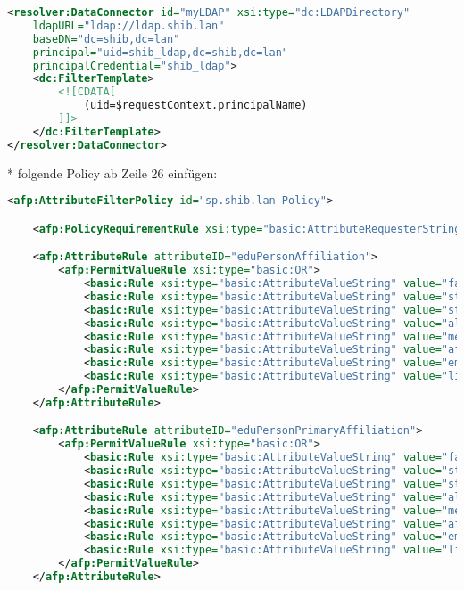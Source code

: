 \begin{lstlisting}[language=xml]
<resolver:DataConnector id="myLDAP" xsi:type="dc:LDAPDirectory"
	ldapURL="ldap://ldap.shib.lan"
	baseDN="dc=shib,dc=lan"
	principal="uid=shib_ldap,dc=shib,dc=lan"
	principalCredential="shib_ldap">
	<dc:FilterTemplate>
		<![CDATA[
			(uid=$requestContext.principalName)
		]]>
	</dc:FilterTemplate>
</resolver:DataConnector>
\end{lstlisting}
* folgende Policy ab Zeile 26 einfügen:
\begin{lstlisting}[language=xml]
<afp:AttributeFilterPolicy id="sp.shib.lan-Policy">

	<afp:PolicyRequirementRule xsi:type="basic:AttributeRequesterString" value="https://sp.shib.lan/shibboleth" />

	<afp:AttributeRule attributeID="eduPersonAffiliation">
		<afp:PermitValueRule xsi:type="basic:OR">
			<basic:Rule xsi:type="basic:AttributeValueString" value="faculty" ignoreCase="true" />
			<basic:Rule xsi:type="basic:AttributeValueString" value="student" ignoreCase="true" />
			<basic:Rule xsi:type="basic:AttributeValueString" value="staff" ignoreCase="true" />
			<basic:Rule xsi:type="basic:AttributeValueString" value="alum" ignoreCase="true" />
			<basic:Rule xsi:type="basic:AttributeValueString" value="member" ignoreCase="true" />
			<basic:Rule xsi:type="basic:AttributeValueString" value="affiliate" ignoreCase="true" />
			<basic:Rule xsi:type="basic:AttributeValueString" value="employee" ignoreCase="true" />
			<basic:Rule xsi:type="basic:AttributeValueString" value="library-walk-in" ignoreCase="true" />
		</afp:PermitValueRule>
	</afp:AttributeRule>

	<afp:AttributeRule attributeID="eduPersonPrimaryAffiliation">
		<afp:PermitValueRule xsi:type="basic:OR">
			<basic:Rule xsi:type="basic:AttributeValueString" value="faculty" ignoreCase="true" />
			<basic:Rule xsi:type="basic:AttributeValueString" value="student" ignoreCase="true" />
			<basic:Rule xsi:type="basic:AttributeValueString" value="staff" ignoreCase="true" />
			<basic:Rule xsi:type="basic:AttributeValueString" value="alum" ignoreCase="true" />
			<basic:Rule xsi:type="basic:AttributeValueString" value="member" ignoreCase="true" />
			<basic:Rule xsi:type="basic:AttributeValueString" value="affiliate" ignoreCase="true" />
			<basic:Rule xsi:type="basic:AttributeValueString" value="employee" ignoreCase="true" />
			<basic:Rule xsi:type="basic:AttributeValueString" value="library-walk-in" ignoreCase="true" />
		</afp:PermitValueRule>
	</afp:AttributeRule>


\end{lstlisting}
